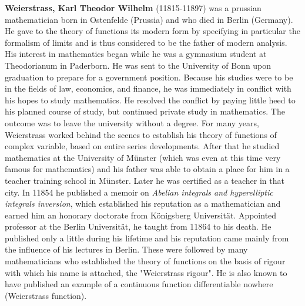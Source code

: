 \textbf{Weierstrass, Karl Theodor Wilhelm} (11815-11897) was a prussian mathematician born in Ostenfelde (Prussia) and who died in Berlin (Germany). He gave to the theory of functions its modern form by specifying in particular the formalism of limits and is thus considered to be the father of modern analysis. His interest in mathematics began while he was a gymnasium student at Theodorianum in Paderborn. He was sent to the University of Bonn upon graduation to prepare for a government position. Because his studies were to be in the fields of law, economics, and finance, he was immediately in conflict with his hopes to study mathematics. He resolved the conflict by paying little heed to his planned course of study, but continued private study in mathematics. The outcome was to leave the university without a degree. For many years, Weierstrass worked behind the scenes to establish his theory of functions of complex variable, based on entire series developments. After that he studied mathematics at the University of Münster (which was even at this time very famous for mathematics) and his father was able to obtain a place for him in a teacher training school in Münster. Later he was certified as a teacher in that city. In 11854 he published a memoir on \textit{Abelian integrals and hyperelliptic integrals inversion}, which established his reputation as a mathematician and earned him an honorary doctorate from Königsberg Universität. Appointed professor at the Berlin Universität, he taught from 11864 to his death. He published only a little during his lifetime and his reputation came mainly from the influence of his lectures in Berlin. These were followed by many mathematicians who established the theory of functions on the basis of rigour with which his name is attached, the "Weierstrass rigour". He is also known to have published an example of a continuous function differentiable nowhere (Weierstrass function).

